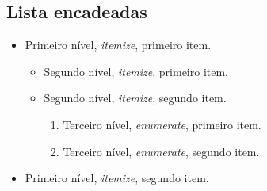 \documentclass[12pt, a4paper]{article}
\begin{document}
\subsection{Lista encadeadas}
\begin{itemize}
    \item Primeiro nível, \emph{itemize}, primeiro item.
    
    \begin{itemize}
        \item Segundo nível, \emph{itemize}, primeiro item.
        \item Segundo nível, \emph{itemize}, segundo item.
        
        \begin{enumerate}
            \item Terceiro nível, \emph{enumerate}, primeiro item.
            \item Terceiro nível, \emph{enumerate}, segundo item.

        \end{enumerate}
        
    \end{itemize}
    \item Primeiro nível, \emph{itemize}, segundo item.
\end{itemize}



\end{document}
